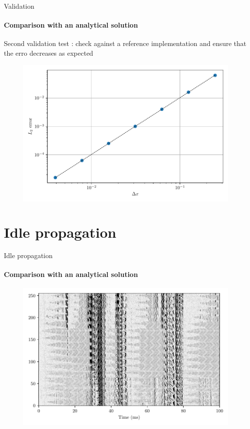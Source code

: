 \documentclass{beamer}
\begin{document}

\begin{frame}{Validation}
    \framesubtitle{Comparison with an analytical solution}
    Second validation test : check against a reference implementation and ensure that the erro decreases as expected

    \begin{figure}
        \centering
        \includegraphics[width=0.8\linewidth]{Figures/Convergence.pdf}
    \end{figure}
\end{frame}


\section{Idle propagation}
\begin{frame}{Idle propagation}
    \framesubtitle{Comparison with an analytical solution}
    \begin{figure}
        \centering
        \includegraphics[width=0.8\linewidth]{Figures/idle_propagation.pdf}
    \end{figure}
\end{frame}
\end{document}
